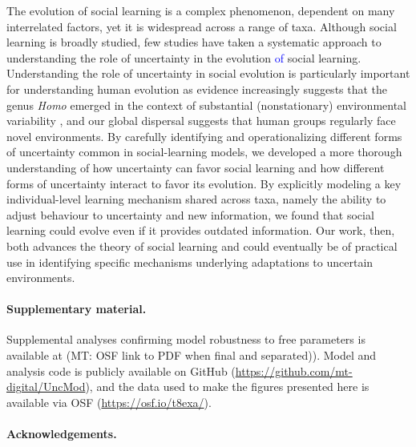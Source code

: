 \documentclass[letterpaper,11.5pt]{scrartcl}
\newcommand{\mt}[1]{{\textcolor{myorange} {({\tiny MT:} #1)}}}
\newcommand{\cm}[1]{{\textcolor{mypurple} {({\tiny CM:} #1)}}}
\newcommand{\edit}[1]{{\textcolor{blue} {#1}}}
\begin{document}
The evolution of social learning is a complex phenomenon, dependent on many interrelated factors, yet it is widespread across a
range of taxa. Although social learning is broadly studied, few studies have taken a systematic approach to understanding the role
of uncertainty in the evolution \edit{of} social learning. Understanding the role of uncertainty in social evolution is particularly important
for understanding human evolution as evidence increasingly suggests that the genus \emph{Homo} emerged in the context of substantial
(nonstationary) environmental variability \citep{anton_etal2014, levin2015}, and our global dispersal suggests that human groups regularly face novel environments. By carefully identifying and operationalizing different forms of uncertainty common in social-learning models, we developed a more thorough understanding of how uncertainty can favor social learning and how different forms of uncertainty interact to favor its evolution. By explicitly modeling a key individual-level learning mechanism shared across taxa, namely the ability to adjust behaviour to uncertainty and new information, we found that social learning could evolve even if it provides outdated information. %
Our work, then, both advances the theory of social learning and could eventually be of practical use in identifying specific mechanisms underlying adaptations to uncertain environments.


\paragraph{Supplementary material.} Supplemental analyses confirming model robustness to free parameters is available at \mt{OSF link to PDF when final and separated)}. Model and analysis code is publicly available on GitHub (\url{https://github.com/mt-digital/UncMod}), and the data used to make the figures presented here is available via OSF (\url{https://osf.io/t8exa/}).

\paragraph{Acknowledgements.} %
% 
\end{document}
